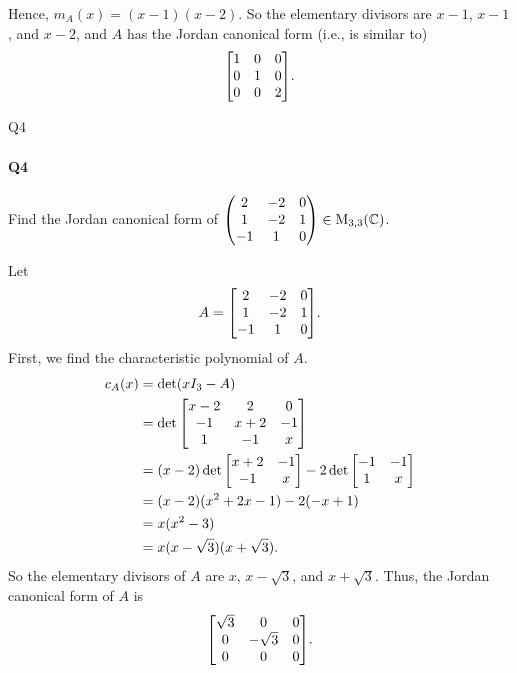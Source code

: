 \documentclass[12pt]{article}
\newenvironment{fullbox}{\begin{lrbox}{\savefullbox}\begin{minipage}{\dimexpr\textwidth-2\fboxsep\relax}}{\end{minipage}\end{lrbox}\begin{center}\framebox[\textwidth]{\usebox{\savefullbox}}\end{center}}
\newenvironment{pbox}[1][]{\begin{fullbox}\ifx#1\empty\else\paragraph{#1}\fi}{\end{fullbox}}
\theoremstyle{definition}
\newcommand{\C}{\mathbb{C}}
\newcommand{\Mat}[1]{\operatorname{M}_{#1, #1}}
\begin{document}
Hence, $m_A(x) = (x - 1)(x - 2)$. So the elementary divisors are $x - 1$, $x - 1$, and $x - 2$, and $A$ has the Jordan canonical form (i.e., is similar to)
\[
    \mqty[\dmat[0]{1, 1, 2}].
\]


\newpage
\begin{pbox}[Q4]
    Find the Jordan canonical form of $\mqty(2 & -2 & 0 \\ 1 & -2 & 1 \\ -1 & 1 & 0) \in \Mat{3}(\C)$.
\end{pbox}

Let
\[
    A = \mqty[2 & -2 & 0 \\ 1 & -2 & 1 \\ -1 & 1 & 0].
\]
First, we find the characteristic polynomial of $A$.
\begin{align*}
    c_A(x) 
        &= \det(xI_3 - A) \\
        &= \det\mqty[x - 2 & 2 & 0 \\ -1 & x + 2 & -1 \\ 1 & -1 & x] \\
        &= (x - 2)\det\mqty[x + 2 & -1 \\ -1 & x] - 2\det\mqty[-1 & -1 \\ 1 & x] \\
        &= (x - 2)(x^2 + 2x - 1) - 2(-x + 1) \\
        &= x(x^2 - 3) \\
        &= x(x - \sqrt{3})(x + \sqrt{3}).
\end{align*}
So the elementary divisors of $A$ are $x$, $x - \sqrt{3}$, and $x + \sqrt{3}$. Thus, the Jordan canonical form of $A$ is
\[
    \mqty[\dmat[0]{\sqrt{3}, -\sqrt{3}, 0}].
\]
\end{document}
